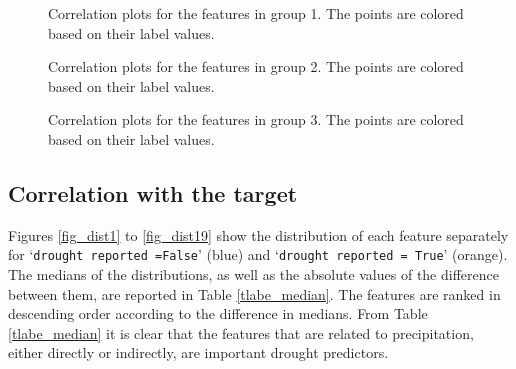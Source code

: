 \documentclass[10pt,parskip=half,
toc=sectionentrywithdots,
bibliography=totocnumbered,
captions=tableheading,numbers=noendperiod]{scrartcl}
\begin{document}
\begin{figure}[H]\begin{center}\end{center}\caption{Correlation plots for the features in group 1. The points are colored
based on their label values.}\label{pairplot1}\end{figure}

\begin{figure}[H]\begin{center}\end{center}\caption{Correlation plots for the features in group 2. The points are colored
based on their label values.}\label{pairplot2}\end{figure}

\begin{figure}[H]\begin{center}\end{center}\caption{Correlation plots for the features in group 3. The points are colored
based on their label values.}\label{pairplot3}\end{figure}

\hypertarget{correlation-with-the-target}{%
\subsection{Correlation with the
target}\label{correlation-with-the-target}}

Figures \ref{fig_dist1} to \ref{fig_dist19} show the distribution of
each feature separately for `\texttt{drought\ reported\ =False}' (blue)
and `\texttt{drought\ reported\ =\ True}' (orange). The medians of the
distributions, as well as the absolute values of the difference between
them, are reported in Table \ref{tlabe_median}. The features are ranked
in descending order according to the difference in medians. From Table
\ref{tlabe_median} it is clear that the features that are related to
precipitation, either directly or indirectly, are important drought
predictors.
\end{document}
